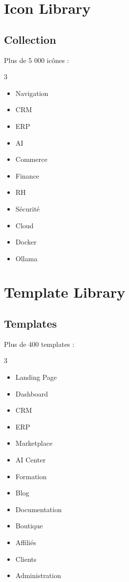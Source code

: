 \documentclass[12pt,a4paper,oneside]{book}
\begin{document}
\chapter{Icon Library}

\section{Collection}
Plus de 5 000 icônes :
\begin{multicols}{3}
\begin{itemize}
\item Navigation
\item CRM
\item ERP
\item AI
\item Commerce
\item Finance
\item RH
\item Sécurité
\item Cloud
\item Docker
\item Ollama
\end{itemize}
\end{multicols}

\chapter{Template Library}

\section{Templates}
Plus de 400 templates :
\begin{multicols}{3}
\begin{itemize}
\item Landing Page
\item Dashboard
\item CRM
\item ERP
\item Marketplace
\item AI Center
\item Formation
\item Blog
\item Documentation
\item Boutique
\item Affiliés
\item Clients
\item Administration
\end{itemize}
\end{multicols}
\end{document}
